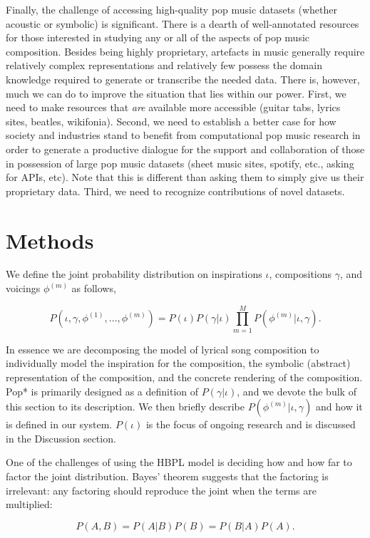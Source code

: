 \documentclass[letterpaper]{article}
\begin{document}
Finally, the challenge of accessing high-quality pop music datasets (whether acoustic or symbolic) is significant. There is a dearth of well-annotated resources for those interested in studying any or all of the aspects of pop music composition. Besides being highly proprietary, artefacts in music generally require relatively complex representations and relatively few possess the domain knowledge required to generate or transcribe the needed data. There is, however, much we can do to improve the situation that lies within our power. First, we need to make resources that \textit{are} available more accessible (guitar tabs, lyrics sites, beatles, wikifonia). Second, we need to establish a better case for how society and industries stand to benefit from computational pop music research in order to generate a productive dialogue for the support and collaboration of those in possession of large pop music datasets (sheet music sites, spotify, etc., asking for APIs, etc). Note that this is different than asking them to simply give us their proprietary data. Third, we need to recognize contributions of novel datasets. 

\section{Methods}

We define the joint probability distribution on inspirations $\iota$, compositions $\gamma$, and voicings $\phi^{(m)}$ as follows,

\[ P(\iota,\gamma,\phi^{(1)}, ..., \phi^{(m)}) = P(\iota)P(\gamma|\iota) \prod_{m=1}^{M} P(\phi^{(m)}|\iota,\gamma). \]

In essence we are decomposing the model of lyrical song composition to individually model the inspiration for the composition, the symbolic (abstract) representation of the composition, and the concrete rendering of the composition. Pop* is primarily designed as a definition of $P(\gamma|\iota)$, and we devote the bulk of this section to its description. We then briefly describe $P(\phi^{(m)}|\iota,\gamma)$ and how it is defined in our system. $P(\iota)$ is the focus of ongoing research and is discussed in the Discussion section.

One of the challenges of using the HBPL model is deciding how and how far to factor the joint distribution. Bayes' theorem suggests that the factoring is irrelevant: any factoring should reproduce the joint when the terms are multiplied:

\[ P(A,B) = P(A|B)P(B) = P(B|A)P(A). \]
\end{document}
